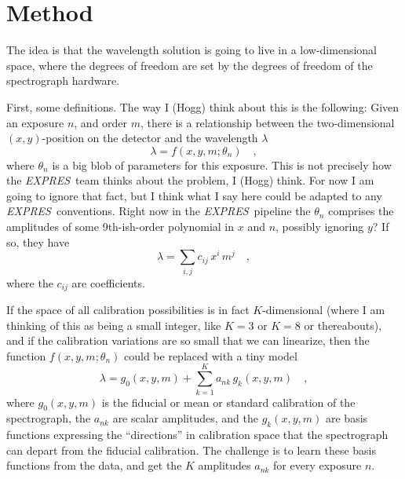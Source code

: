 \documentclass[12pt, letterpaper]{article}
\newcommand{\project}[1]{\textsl{#1}}
\newcommand{\acronym}[1]{{\small{#1}}}
\newcommand{\expres}{\project{\acronym{EXPRES}}}
\begin{document}
\section*{Method}

The idea is that the wavelength solution is going to live in a
low-dimensional space, where the degrees of freedom are set by the
degrees of freedom of the spectrograph hardware.

First, some definitions.
The way I (Hogg) think about this is the following:
Given an exposure $n$, and order $m$, there is a relationship between
the two-dimensional $(x,y)$-position on the detector and the
wavelength $\lambda$
\begin{equation}
\lambda = f(x,y,m;\theta_{n})
\quad ,
\end{equation}
where $\theta_{n}$ is a big blob of parameters for this exposure.
This is not precisely how the \expres\ team thinks about the problem,
I (Hogg) think.
For now I am going to ignore that fact, but I think what I say here
could be adapted to any \expres\ conventions.
Right now in the \expres\ pipeline the $\theta_{n}$ comprises the
amplitudes of some 9th-ish-order polynomial in $x$ and $n$, possibly
ignoring $y$?
If so, they have
\begin{equation}
\lambda = \sum_{i,j} c_{ij}\, x^i\,m^j
\quad ,
\end{equation}
where the $c_{ij}$ are coefficients.

If the space of all calibration possibilities is in fact
$K$-dimensional (where I am thinking of this as being a small integer,
like $K=3$ or $K=8$ or thereabouts), and if the calibration variations are so
small that we can linearize, then the function $f(x,y,m;\theta_{n})$ could
be replaced with a tiny model
\begin{equation}
\lambda = g_0(x,y,m) + \sum_{k=1}^K a_{nk}\,g_k(x,y,m)
\quad ,
\end{equation}
where
$g_0(x,y,m)$ is the fiducial or mean or standard calibration of the
spectrograph,
the $a_{nk}$ are scalar amplitudes,
and the $g_k(x,y,m)$ are basis functions expressing the ``directions''
in calibration space that the spectrograph can depart from the
fiducial calibration.
The challenge is to learn these basis functions from the data, and get
the $K$ amplitudes $a_{nk}$ for every exposure $n$.
\end{document}
